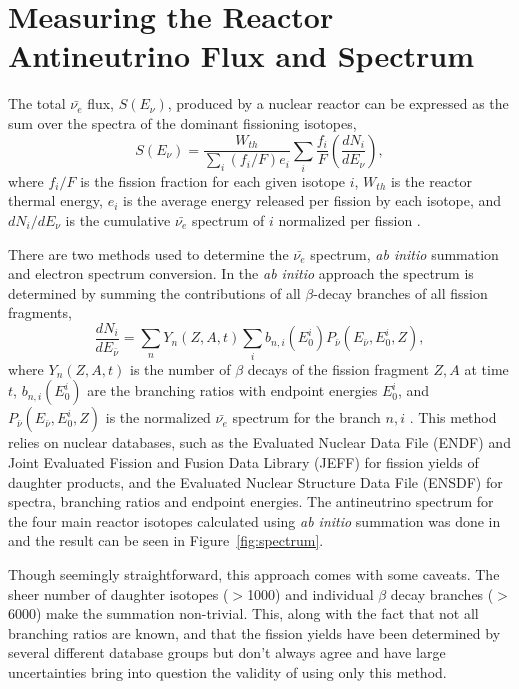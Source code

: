 \section{Measuring the Reactor Antineutrino Flux and Spectrum}

The total $\bar{\nu_{e}}$ flux, $S(E_\nu)$, produced by a nuclear reactor can be expressed as the sum over the spectra of the dominant fissioning isotopes,
\begin{equation}
	S(E_\nu) = \frac{W_{th}}{\sum_{i}(f_i/F)e_i}\sum_{i}\frac{f_i}{F}\left(\frac{dN_i}{dE_\nu}\right) ,
\end{equation}
where $f_i/F$ is the fission fraction for each given isotope $i$, $W_{th}$ is the reactor thermal energy, $e_i$ is the 
average energy released per fission by each isotope, and $dN_i/dE_\nu$ is the cumulative $\bar{\nu_e}$ spectrum of $i$ normalized per fission \cite{HayesVogel}.

There are two methods used to determine the $\bar{\nu_e}$ spectrum, \textit{ab initio} summation and electron spectrum conversion.
In the \textit{ab initio} approach the spectrum is determined by summing the contributions of all $\beta$-decay branches of all fission fragments,
\begin{equation}
	\frac{dN_i}{dE_{\bar{\nu}}} =  \sum_{n}Y_n(Z,A,t)\sum_{i}b_{n,i}(E^i_0)P_{\bar{\nu}}(E_{\bar{\nu}},E^i_0,Z) ,
\end{equation}
where $Y_n(Z,A,t)$ is the number of $\beta$ decays of the fission fragment $Z, A$ at time $t$, $b_{n,i}(E^i_0)$ are the branching ratios with endpoint energies $E^i_0$, and $P_{\bar{\nu}}(E_{\bar{\nu}},E^i_0,Z)$ is the normalized $\bar{\nu_e}$ spectrum for the branch $n, i$ \cite{HayesVogel}.
This method relies on nuclear databases, such as the Evaluated Nuclear Data File (ENDF) \cite{ENDF} and Joint Evaluated Fission and Fusion Data Library (JEFF) \cite{JEFF} for fission yields of daughter products, and the Evaluated Nuclear Structure Data File (ENSDF) \cite{ENSDF} for spectra, branching ratios and endpoint energies.
The antineutrino spectrum for the four main reactor isotopes calculated using \textit{ab initio} summation was done in~\cite{HayesVogel} and the result can be seen in Figure~\ref{fig:spectrum}. 

Though seemingly straightforward, this approach comes with some caveats.
The sheer number of daughter isotopes ($>$1000) and individual $\beta$ decay branches ($>$6000) make the summation non-trivial.
This, along with the fact that not all branching ratios are known, and that the fission yields have been determined by several different database groups but don't always agree and have large uncertainties bring into question the validity of using only this method. 

